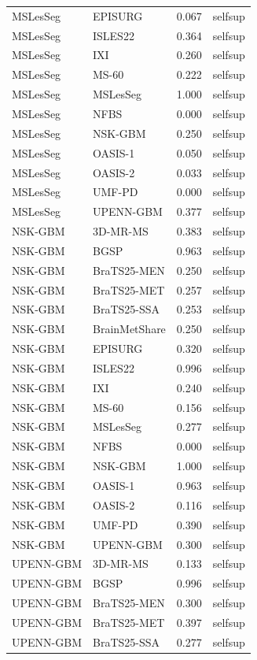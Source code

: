 \begin{tabular}{llrl}
MSLesSeg & EPISURG & 0.067 & selfsup \\
MSLesSeg & ISLES22 & 0.364 & selfsup \\
MSLesSeg & IXI & 0.260 & selfsup \\
MSLesSeg & MS-60 & 0.222 & selfsup \\
MSLesSeg & MSLesSeg & 1.000 & selfsup \\
MSLesSeg & NFBS & 0.000 & selfsup \\
MSLesSeg & NSK-GBM & 0.250 & selfsup \\
MSLesSeg & OASIS-1 & 0.050 & selfsup \\
MSLesSeg & OASIS-2 & 0.033 & selfsup \\
MSLesSeg & UMF-PD & 0.000 & selfsup \\
MSLesSeg & UPENN-GBM & 0.377 & selfsup \\
NSK-GBM & 3D-MR-MS & 0.383 & selfsup \\
NSK-GBM & BGSP & 0.963 & selfsup \\
NSK-GBM & BraTS25-MEN & 0.250 & selfsup \\
NSK-GBM & BraTS25-MET & 0.257 & selfsup \\
NSK-GBM & BraTS25-SSA & 0.253 & selfsup \\
NSK-GBM & BrainMetShare & 0.250 & selfsup \\
NSK-GBM & EPISURG & 0.320 & selfsup \\
NSK-GBM & ISLES22 & 0.996 & selfsup \\
NSK-GBM & IXI & 0.240 & selfsup \\
NSK-GBM & MS-60 & 0.156 & selfsup \\
NSK-GBM & MSLesSeg & 0.277 & selfsup \\
NSK-GBM & NFBS & 0.000 & selfsup \\
NSK-GBM & NSK-GBM & 1.000 & selfsup \\
NSK-GBM & OASIS-1 & 0.963 & selfsup \\
NSK-GBM & OASIS-2 & 0.116 & selfsup \\
NSK-GBM & UMF-PD & 0.390 & selfsup \\
NSK-GBM & UPENN-GBM & 0.300 & selfsup \\
UPENN-GBM & 3D-MR-MS & 0.133 & selfsup \\
UPENN-GBM & BGSP & 0.996 & selfsup \\
UPENN-GBM & BraTS25-MEN & 0.300 & selfsup \\
UPENN-GBM & BraTS25-MET & 0.397 & selfsup \\
UPENN-GBM & BraTS25-SSA & 0.277 & selfsup \\

\end{tabular}

